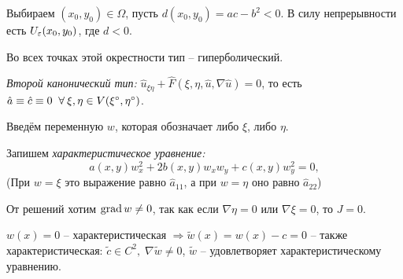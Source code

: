 \documentclass[../main.tex]{subfiles}
\begin{document}

Выбираем $(x_0, y_0) \in \Omega$, пусть $d(x_0, y_0) = ac - b^2 < 0$. В силу непрерывности есть $U_\varepsilon(x_0, y_0)$, где $d < 0$.

Во всех точках этой окрестности тип -- гиперболический.

\begin{definition}
\textit{Второй канонический тип:} $\hat{u}_{\xi\eta} + \hat{F}(\xi, \eta, \hat{u}, \nabla \hat{u}) = 0$, то есть $\hat{a} \equiv \hat{c} \equiv 0 \;\;\forall\: \xi, \eta \in V(\xi^{\circ}, \eta^{\circ})$.
\end{definition}
Введём переменную $w$, которая обозначает либо $\xi$, либо $\eta$.

Запишем \textit{характеристическое уравнение:}
\begin{equation*}
	a(x, y) w^{2}_x + 2b(x, y)w_x w_y + c(x, y)w_y^2  = 0, 
\end{equation*}
(При $w = \xi$ это выражение равно $\hat a_{11}$, а при $w = \eta$ оно равно $\hat a_{22}$)

От решений хотим $\operatorname{grad} w \neq 0$, так как если $\nabla \eta = 0$ или $\nabla \xi = 0$, то $J = 0$.

\begin{remark}
	$w(x) = 0$ -- характеристическая $\Rightarrow \tilde{w}(x) =  w(x) - c = 0$ -- также характеристическая: $\tilde{c} \in C^2,\; \nabla \tilde{w} \neq 0$, $\tilde{w}$ -- удовлетворяет характеристическому уравнению.
\end{remark}
\end{document}
